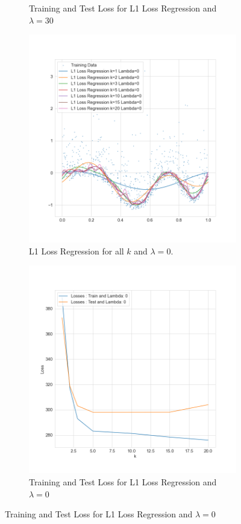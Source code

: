 \documentclass{./tufte-handout}
\begin{document}
\begin{enumerate}[(a)]
\begin{enumerate}
\begin{figure}
\begin{subfigure}[b]{.5\textwidth}
        \caption{Training and Test Loss for L1 Loss Regression and $\lambda=30$}
    \end{subfigure}
    \begin{subfigure}[b]{.5\textwidth}
        \includegraphics{../figures/l1_regression_all_k_lambda_0.png}
        \caption{L1 Loss Regression for all $k$ and $\lambda=0$.}
    \end{subfigure}%
    \begin{subfigure}[b]{.5\textwidth}
        \includegraphics{../figures/l1_losses_for_k_lambda_0.png}
        \caption{Training and Test Loss for L1 Loss Regression and $\lambda=0$}
    \end{subfigure}


\end{figure}
\end{enumerate}
\end{enumerate}
\end{document}
